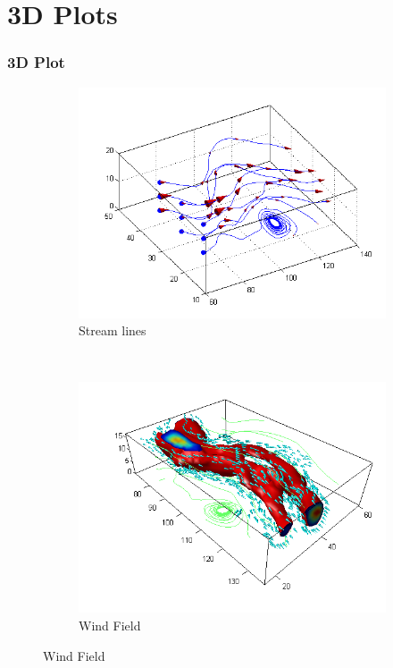 \documentclass{beamer}  %
\begin{document}
\section{3D Plots}
\begin{frame}[fragile]
\frametitle{3D Plot}
\begin{figure}
        \begin{subfigure}[b]{0.4\textwidth}
                \centering
                \includegraphics[width=\textwidth]{Streamline_01.png}
                \caption{Stream lines\cite{matlab_gallery} }
        \end{subfigure}%
        ~
        \begin{subfigure}[b]{0.4\textwidth}
                \centering
                \includegraphics[width=\textwidth]{Wind_01.png}
                \caption{Wind Field\cite{matlab_gallery}}
        \end{subfigure}
\end{figure}

\end{frame}
\end{document}
